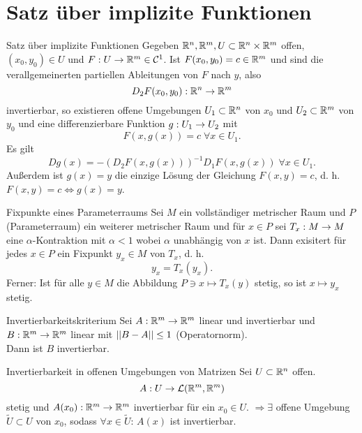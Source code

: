 \documentclass[main.tex]{subfiles}
\begin{document}
\section*{Satz über implizite Funktionen}

\begin{karte}{Satz über implizite Funktionen}
    Gegeben \( \mathbb{R}^n, \mathbb{R}^m, U \subset \mathbb{R}^n \times \mathbb{R}^m \) 
    offen, \( (x_0,y_0)\in U \) und \( F : U \rightarrow \mathbb{R}^m \in \mathcal{C}^1 \). 
    Ist \( F(x_0, y_0) = c\in \mathbb{R}^m \) und sind die verallgemeinerten partiellen 
    Ableitungen von \( F \) nach \( y \), also 
    \[ D_2 F(x_0, y_0) : \mathbb{R}^n \rightarrow \mathbb{R}^m \] 
    invertierbar, so existieren offene Umgebungen \( U_1 \subset \mathbb{R}^n \) 
    von \(x_0\) und \( U_2 \subset \mathbb{R}^m \) von \(y_0\) und eine 
    differenzierbare Funktion \( g : U_1 \rightarrow U_2 \) mit 
    \[ F(x, g(x)) = c \;\forall x\in U_1. \]
    Es gilt 
    \[ Dg(x) = -(D_2 F(x,g(x)))^{-1} D_1 F(x,g(x)) \;\forall x\in U_1. \]
    Außerdem ist \( g(x) = y \) die einzige Lösung der Gleichung 
    \( F(x,y) = c \), d. h. \( F(x,y) = c \Leftrightarrow g(x) = y \).
\end{karte}

\begin{karte}{Fixpunkte eines Parameterraums}
    Sei \( M \) ein vollständiger metrischer Raum und \( P \) 
    (Parameterraum) ein weiterer metrischer Raum und für \( x\in P \)     
    sei \(T_x : M \rightarrow M\) eine \(\alpha\)-Kontraktion mit \(\alpha < 1\)
    wobei \(\alpha\) unabhängig von \(x\) ist. Dann exisitert für jedes \(x \in P\)
    ein Fixpunkt \(y_x \in M\) von \(T_x\), d. h. 
    \[ y_x = T_x(y_x). \]
    Ferner: Ist für alle \(y \in M\) die Abbildung 
    \(P \ni x \mapsto T_x(y)\) stetig, so ist
    \( x \mapsto y_x \) stetig.
\end{karte}

\begin{karte}{Invertierbarkeitskriterium}
    Sei \( A : \mathbb{R}^m \rightarrow \mathbb{R}^m \) linear und 
    invertierbar und \( B : \mathbb{R}^m \rightarrow \mathbb{R}^m \) 
    linear mit \(\left|\left|B-A\right|\right| \leq 1\) (Operatornorm). \\
    Dann ist \( B \) invertierbar.
\end{karte}

\begin{karte}{Invertierbarkeit in offenen Umgebungen von Matrizen}
    Sei \( U \subset \mathbb{R}^n \) offen. 
    \[ A : U \rightarrow \mathcal{L}(\mathbb{R}^m, \mathbb{R}^m) \]
    stetig und \( A(x_0) : \mathbb{R}^m \rightarrow \mathbb{R}^m \) invertierbar 
    für ein \( x_0 \in U \). \( \Rightarrow \exists \) offene Umgebung 
    \( \tilde{U} \subset U \) von \( x_0 \), sodass \( \forall x \in \tilde{U} \): 
    \( A(x) \) ist invertierbar.
\end{karte}
\end{document}
